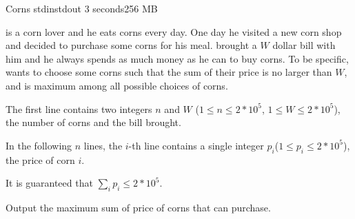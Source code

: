 \begin{problem}{Corns}
{stdin}{stdout}
{3 seconds}{256 MB}{}

\pittoresque is a corn lover and he eats corns every day. One day he visited a new corn shop and decided to purchase some corns for his meal. \pittoresque brought a $W$ dollar bill with him and he always spends as much money as he can to buy corns. To be specific, \pittoresque wants to choose some corns such that the sum of their price is no larger than $W$, and is maximum among all possible choices of corns.


\InputFile

The first line contains two integers $n$ and $W$ ($1 \le n \le 2 * 10^5$, $1 \le W \le 2 * 10^5$), the number of corns and the bill \pittoresque brought.

In the following $n$ lines, the $i$-th line contains a single integer $p_i$($1 \le p_i \le 2 * 10^5$), the price of corn $i$.

It is guaranteed that $\sum_i p_i \leq 2 * 10^5$.

\OutputFile

Output the maximum sum of price of corns that \pittoresque can purchase.

\Examples

\begin{example}
%
\end{example}

\begin{example}
%
\end{example}



\end{problem}
